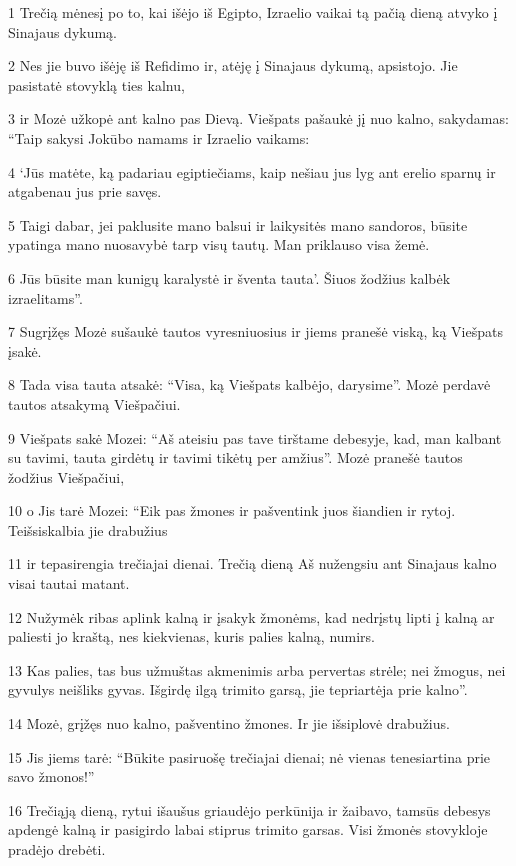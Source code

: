 \par 1 Trečią mėnesį po to, kai išėjo iš Egipto, Izraelio vaikai tą pačią dieną atvyko į Sinajaus dykumą. 
\par 2 Nes jie buvo išėję iš Refidimo ir, atėję į Sinajaus dykumą, apsistojo. Jie pasistatė stovyklą ties kalnu, 
\par 3 ir Mozė užkopė ant kalno pas Dievą. Viešpats pašaukė jį nuo kalno, sakydamas: “Taip sakysi Jokūbo namams ir Izraelio vaikams: 
\par 4 ‘Jūs matėte, ką padariau egiptiečiams, kaip nešiau jus lyg ant erelio sparnų ir atgabenau jus prie savęs. 
\par 5 Taigi dabar, jei paklusite mano balsui ir laikysitės mano sandoros, būsite ypatinga mano nuosavybė tarp visų tautų. Man priklauso visa žemė. 
\par 6 Jūs būsite man kunigų karalystė ir šventa tauta’. Šiuos žodžius kalbėk izraelitams”. 
\par 7 Sugrįžęs Mozė sušaukė tautos vyresniuosius ir jiems pranešė viską, ką Viešpats įsakė. 
\par 8 Tada visa tauta atsakė: “Visa, ką Viešpats kalbėjo, darysime”. Mozė perdavė tautos atsakymą Viešpačiui. 
\par 9 Viešpats sakė Mozei: “Aš ateisiu pas tave tirštame debesyje, kad, man kalbant su tavimi, tauta girdėtų ir tavimi tikėtų per amžius”. Mozė pranešė tautos žodžius Viešpačiui, 
\par 10 o Jis tarė Mozei: “Eik pas žmones ir pašventink juos šiandien ir rytoj. Teišsiskalbia jie drabužius 
\par 11 ir tepasirengia trečiajai dienai. Trečią dieną Aš nužengsiu ant Sinajaus kalno visai tautai matant. 
\par 12 Nužymėk ribas aplink kalną ir įsakyk žmonėms, kad nedrįstų lipti į kalną ar paliesti jo kraštą, nes kiekvienas, kuris palies kalną, numirs. 
\par 13 Kas palies, tas bus užmuštas akmenimis arba pervertas strėle; nei žmogus, nei gyvulys neišliks gyvas. Išgirdę ilgą trimito garsą, jie tepriartėja prie kalno”. 
\par 14 Mozė, grįžęs nuo kalno, pašventino žmones. Ir jie išsiplovė drabužius. 
\par 15 Jis jiems tarė: “Būkite pasiruošę trečiajai dienai; nė vienas tenesiartina prie savo žmonos!” 
\par 16 Trečiąją dieną, rytui išaušus griaudėjo perkūnija ir žaibavo, tamsūs debesys apdengė kalną ir pasigirdo labai stiprus trimito garsas. Visi žmonės stovykloje pradėjo drebėti. 
